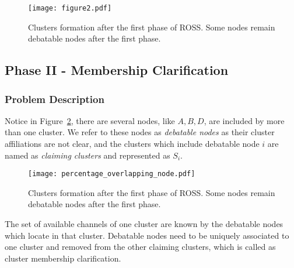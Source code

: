 

\begin{figure}[ht!]
  \centering
  \texttt{[image: figure2.pdf]}
  \caption{Clusters formation after the first phase of ROSS. Some nodes remain debatable nodes after the first phase.}\label{fig2}
\end{figure}


\subsection{Phase II - Membership Clarification}
\subsubsection{Problem Description}
Notice in Figure~\ref{fig2}, there are several nodes, like $A, B, D$, are included by more than one cluster. 
We refer to these nodes as \textit{debatable nodes} as their cluster affiliations are not clear, and the clusters which include debatable node $i$ are named as \textit{claiming clusters} and represented as $S_i$. 

\begin{figure}[ht!]
  \centering
  \texttt{[image: percentage\_overlapping\_node.pdf]}
  \caption{Clusters formation after the first phase of ROSS. Some nodes remain debatable nodes after the first phase.}\label{fig2}
\end{figure}


The set of available channels of one cluster are known by the debatable nodes which locate in that cluster. %
Debatable nodes need to be uniquely associated to one cluster and removed from the other claiming clusters, which is called as cluster membership clarification.

